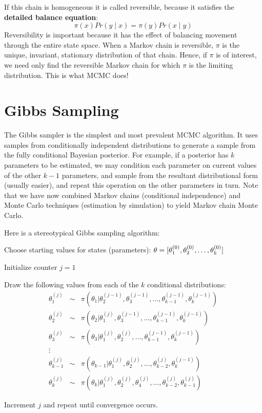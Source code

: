 \documentclass[]{book}
\begin{document}
\noindent If this chain is homogeneous it is called reversible, because it satisfies the \textbf{detailed balance equation}:
\[
\pi(x)Pr(y \mid x) = \pi(y) Pr(x \mid y)
\]
Reversibility is important because it has the effect of balancing movement through the entire state space. When a Markov chain is reversible, $\pi$ is the unique, invariant, stationary distribution of that chain.
Hence, if $\pi$ is of interest, we need only find the reversible Markov chain for which $\pi$ is the limiting distribution. This is what MCMC does!


\section{Gibbs Sampling}

The Gibbs sampler is the simplest and most prevalent MCMC algorithm. It uses samples from conditionally independent distributions to generate a sample from the fully conditional Bayesian posterior. For example, if a posterior has $k$ parameters to be estimated, we may condition each parameter on current values of the other $k-1$ parameters, and sample from the resultant distributional form (usually easier), and repeat this operation on the other parameters in turn. Note that we have now combined Markov chains (conditional independence) and Monte Carlo techniques (estimation by simulation) to yield Markov chain Monte Carlo.

Here is a stereotypical Gibbs sampling algorithm:

\begin{list}{}
{}
\item Choose starting values for states (parameters): ${\bf \theta} = [\theta_1^{(0)},\theta_2^{(0)},\ldots,\theta_k^{(0)}]$
\item Initialize counter $j=1$
\item Draw the following values from each of the $k$ conditional distributions:
\begin{eqnarray*}
\theta_1^{(j)} &\sim& \pi(\theta_1 | \theta_2^{(j-1)},\theta_3^{(j-1)},\ldots,\theta_{k-1}^{(j-1)},\theta_k^{(j-1)}) \\
\theta_2^{(j)} &\sim& \pi(\theta_2 | \theta_1^{(j)},\theta_3^{(j-1)},\ldots,\theta_{k-1}^{(j-1)},\theta_k^{(j-1)}) \\
\theta_3^{(j)} &\sim& \pi(\theta_3 | \theta_1^{(j)},\theta_2^{(j)},\ldots,\theta_{k-1}^{(j-1)},\theta_k^{(j-1)}) \\
\vdots \\
\theta_{k-1}^{(j)} &\sim& \pi(\theta_{k-1} | \theta_1^{(j)},\theta_2^{(j)},\ldots,\theta_{k-2}^{(j)},\theta_k^{(j-1)}) \\
\theta_k^{(j)} &\sim& \pi(\theta_k | \theta_1^{(j)},\theta_2^{(j)},\theta_4^{(j)},\ldots,\theta_{k-2}^{(j)},\theta_{k-1}^{(j)})
\end{eqnarray*}
\item Increment $j$ and repeat until convergence occurs.
\end{list}
\end{document}
